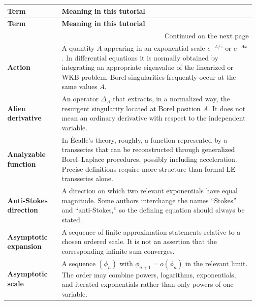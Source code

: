 \documentclass[11pt,openany]{book}
\theoremstyle{definition}
\theoremstyle{plain}
\theoremstyle{remark}
\newcommand{\alien}{\Delta}
\begin{document}
\renewcommand{\arraystretch}{1.16}
\begin{longtable}{@{}p{}p{}@{}}
\toprule
\textbf{Term} & \textbf{Meaning in this tutorial}\\
\midrule
\endfirsthead
\toprule
\textbf{Term} & \textbf{Meaning in this tutorial}\\
\midrule
\endhead
\midrule
\multicolumn{2}{r}{\small Continued on the next page}\\
\endfoot
\bottomrule
\endlastfoot

\textbf{Action}\index{action}
& A quantity $A$ appearing in an exponential scale $e^{-A/z}$ or $e^{-A x}$.
In differential equations it is normally obtained by integrating an
appropriate eigenvalue of the linearized or WKB problem. Borel singularities
frequently occur at the same values $A$.\\

\textbf{Alien derivative}\index{alien derivative}
& An operator $\alien_A$ that extracts, in a normalized way, the resurgent
singularity located at Borel position $A$. It does not mean an ordinary
derivative with respect to the independent variable.\\

\textbf{Analyzable function}\index{analyzable function}
& In \`Ecalle's theory, roughly, a function represented by a transseries that
can be reconstructed through generalized Borel--Laplace procedures, possibly
including acceleration. Precise definitions require more structure than
formal LE transseries alone.\\

\textbf{Anti-Stokes direction}\index{anti-Stokes direction}
& A direction on which two relevant exponentials have equal magnitude. Some
authors interchange the names ``Stokes'' and ``anti-Stokes,'' so the defining
equation should always be stated.\\

\textbf{Asymptotic expansion}\index{asymptotic expansion}
& A sequence of finite approximation statements relative to a chosen ordered
scale. It is not an assertion that the corresponding infinite sum converges.\\

\textbf{Asymptotic scale}\index{asymptotic scale}
& A sequence $(\phi_n)$ with $\phi_{n+1}=o(\phi_n)$ in the relevant limit.
The order may combine powers, logarithms, exponentials, and iterated
exponentials rather than only powers of one variable.\\


\end{longtable}
\end{document}
